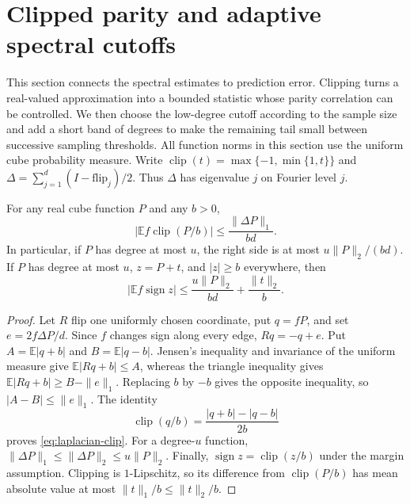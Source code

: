 \section{Clipped parity and adaptive spectral cutoffs}
\label{sec:adaptive}
This section connects the spectral estimates to prediction error.
Clipping turns a real-valued approximation into a bounded statistic whose
parity correlation can be controlled. We then choose the low-degree
cutoff according to the sample size and add a short band of degrees to
make the remaining tail small between successive sampling thresholds.
All function norms in this section use the uniform cube probability
measure. Write $\operatorname{clip}(t)=\max\{-1,\min\{1,t\}\}$ and
$\Delta=\sum_{j=1}^d(I-\mathrm{flip}_j)/2$. Thus $\Delta$ has eigenvalue
$j$ on Fourier level $j$.

\begin{lemma}\label{lem:clipped-parity}
For any real cube function $P$ and any $b>0$,
\begin{equation}\label{eq:laplacian-clip}
 \left|\mathbb E f\operatorname{clip}(P/b)\right|
 \le\frac{\|\Delta P\|_1}{bd}.
\end{equation}
In particular, if $P$ has degree at most $u$, the right side is at most
$u\|P\|_2/(bd)$. If $P$ has degree at most $u$, $z=P+t$, and
$|z|\ge b$ everywhere, then
\begin{equation}\label{eq:margin-clip}
 \left|\mathbb E f\operatorname{sign}z\right|
 \le\frac{u\|P\|_2}{bd}+\frac{\|t\|_2}{b}.
\end{equation}
\end{lemma}
\begin{proof}
Let $R$ flip one uniformly chosen coordinate, put $q=fP$, and set
$e=2f\Delta P/d$. Since $f$ changes sign along every edge,
$Rq=-q+e$. Put $A=\mathbb E|q+b|$ and $B=\mathbb E|q-b|$.
Jensen's inequality and invariance of the uniform measure give
$\mathbb E|Rq+b|\le A$, whereas the triangle inequality gives
$\mathbb E|Rq+b|\ge B-\|e\|_1$. Replacing $b$ by $-b$ gives the
opposite inequality, so $|A-B|\le\|e\|_1$. The identity
\[
 \operatorname{clip}(q/b)=\frac{|q+b|-|q-b|}{2b}
\]
proves \eqref{eq:laplacian-clip}. For a degree-$u$ function,
$\|\Delta P\|_1\le\|\Delta P\|_2\le u\|P\|_2$.
Finally, $\operatorname{sign}z=\operatorname{clip}(z/b)$ under the
margin assumption. Clipping is $1$-Lipschitz, so its difference from
$\operatorname{clip}(P/b)$ has mean absolute value at most
$\|t\|_1/b\le\|t\|_2/b$.
\end{proof}

